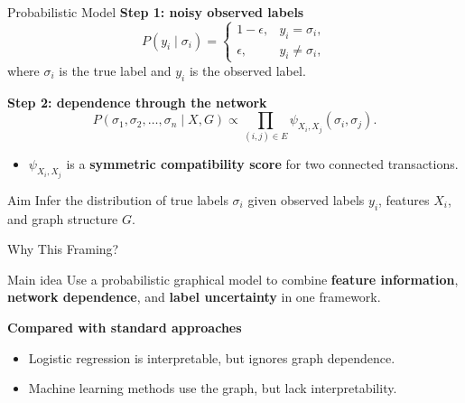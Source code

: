\documentclass[aspectratio=169]{beamer}
\begin{document}
\begin{frame}{Probabilistic Model}
    \textbf{Step 1: noisy observed labels}
    \[
        P(y_i\mid \sigma_i)=
        \begin{cases}
            1-\epsilon, & y_i=\sigma_i,     \\
            \epsilon,   & y_i\neq \sigma_i,
        \end{cases}
    \]
    where $\sigma_i$ is the true label and $y_i$ is the observed label.

    \vspace{0.7em}
    \textbf{Step 2: dependence through the network}
    \[
        P(\sigma_1,\sigma_2,\ldots,\sigma_n\mid X,G)
        \propto
        \prod_{(i,j)\in E} \psi_{X_i,X_j}(\sigma_i,\sigma_j).
    \]

    \begin{itemize}
        \item $\psi_{X_i,X_j}$ is a \textbf{symmetric compatibility score} for two connected transactions.
    \end{itemize}

    \begin{block}{Aim}
        Infer the distribution of true labels $\sigma_i$ given observed labels $y_i$, features $X_i$, and graph structure $G$.
    \end{block}

\end{frame}

\begin{frame}{Why This Framing?}
    \begin{block}{Main idea}
        Use a probabilistic graphical model to combine \textbf{feature information}, \textbf{network dependence}, and \textbf{label uncertainty} in one framework.
    \end{block}

    \vspace{0.5em}
    \textbf{Compared with standard approaches}
    \begin{itemize}
        \item Logistic regression is interpretable, but ignores graph dependence.
        \item Machine learning methods use the graph, but lack interpretability.
    \end{itemize}
\end{frame}
\end{document}
